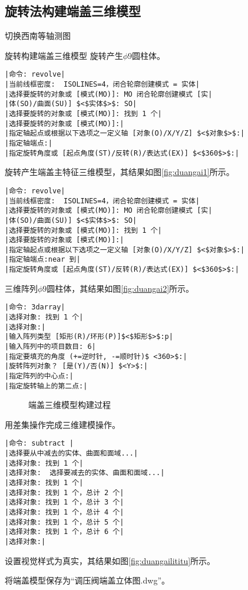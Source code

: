 \subsection{旋转法构建端盖三维模型}
\begin{procedure}
\item 切换西南等轴测图

\item 旋转构建端盖三维模型
旋转产生$\phi 9$圆柱体。
\begin{lstlisting}
|命令: revolve|
|当前线框密度:  ISOLINES=4，闭合轮廓创建模式 = 实体|
|选择要旋转的对象或 [模式(MO)]: MO 闭合轮廓创建模式 [实|
|体(SO)/曲面(SU)] $<$实体$>$: SO|
|选择要旋转的对象或 [模式(MO)]: 找到 1 个|
|选择要旋转的对象或 [模式(MO)]:|
|指定轴起点或根据以下选项之一定义轴 [对象(O)/X/Y/Z] $<$对象$>$:|
|指定轴端点:|
|指定旋转角度或 [起点角度(ST)/反转(R)/表达式(EX)] $<$360$>$:|
\end{lstlisting}
旋转产生端盖主特征三维模型，其结果如图\ref{fig:duangai1}所示。

\begin{lstlisting}
|命令: revolve|
|当前线框密度:  ISOLINES=4，闭合轮廓创建模式 = 实体|
|选择要旋转的对象或 [模式(MO)]: MO 闭合轮廓创建模式 [实|
|体(SO)/曲面(SU)] $<$实体$>$: SO|
|选择要旋转的对象或 [模式(MO)]: 找到 1 个|
|选择要旋转的对象或 [模式(MO)]:|
|指定轴起点或根据以下选项之一定义轴 [对象(O)/X/Y/Z] $<$对象$>$:|
|指定轴端点:near 到|
|指定旋转角度或 [起点角度(ST)/反转(R)/表达式(EX)] $<$360$>$:|
\end{lstlisting}
\item 三维阵列$\phi 9$圆柱体，其结果如图\ref{fig:duangai2}所示。
\begin{lstlisting}
|命令: 3darray|
|选择对象: 找到 1 个|
|选择对象:|
|输入阵列类型 [矩形(R)/环形(P)]$<$矩形$>$:p|
|输入阵列中的项目数目: 6|
|指定要填充的角度 (+=逆时针, -=顺时针)$ <360>$:|
|旋转阵列对象？ [是(Y)/否(N)] $<Y>$:|
|指定阵列的中心点:|
|指定旋转轴上的第二点:|
\end{lstlisting}
\begin{figure}[htbp]
\centering
{}\hspace{30pt}
\hspace{30pt}
\caption{端盖三维模型构建过程}
\end{figure}
\item 用差集操作完成三维建模操作。
\begin{lstlisting}
|命令: subtract |
|选择要从中减去的实体、曲面和面域...|
|选择对象: 找到 1 个|
|选择对象:  选择要减去的实体、曲面和面域...|
|选择对象: 找到 1 个|
|选择对象: 找到 1 个，总计 2 个|
|选择对象: 找到 1 个，总计 3 个|
|选择对象: 找到 1 个，总计 4 个|
|选择对象: 找到 1 个，总计 5 个|
|选择对象: 找到 1 个，总计 6 个|
|选择对象:|
\end{lstlisting}
\item 设置视觉样式为真实，其结果如图\ref{fig:duangailititu}所示。
\item 将端盖模型保存为“调压阀端盖立体图.dwg”。
\end{procedure}